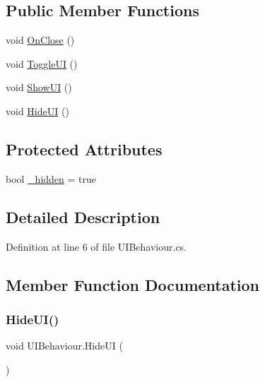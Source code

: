 \subsection*{Public Member Functions}
\begin{DoxyCompactItemize}
\item 
void \mbox{\hyperlink{class_u_i_behaviour_a058150104cbc5deee5bb2d2c8811380a}{On\+Close}} ()
\item 
void \mbox{\hyperlink{class_u_i_behaviour_a508b07927b86c1f75ab1eeb45674f040}{Toggle\+UI}} ()
\item 
void \mbox{\hyperlink{class_u_i_behaviour_a14585d2d40b493d7999564d8a51d51c5}{Show\+UI}} ()
\item 
void \mbox{\hyperlink{class_u_i_behaviour_a16ec3362b1f53b371aa8c5a8a3ec80e7}{Hide\+UI}} ()
\end{DoxyCompactItemize}
\subsection*{Protected Attributes}
\begin{DoxyCompactItemize}
\item 
bool \mbox{\hyperlink{class_u_i_behaviour_a0421d4dc2987f0c48b88cc6175d993e5}{\+\_\+hidden}} = true
\end{DoxyCompactItemize}


\subsection{Detailed Description}


Definition at line 6 of file U\+I\+Behaviour.\+cs.



\subsection{Member Function Documentation}
\mbox{\label{class_u_i_behaviour_a16ec3362b1f53b371aa8c5a8a3ec80e7}} 
\subsubsection{\texorpdfstring{HideUI()}{HideUI()}}
{\footnotesize\ttfamily void U\+I\+Behaviour.\+Hide\+UI (\begin{DoxyParamCaption}{ }\end{DoxyParamCaption})}



